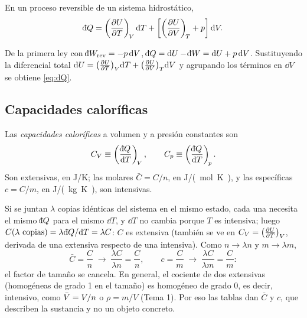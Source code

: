 \begin{proposicion}
En un proceso reversible de un sistema hidrostático,
\begin{equation}\label{eq:dQ}
  \dbar Q=\pd{U}{T}{V}\dd T+\left[\pd{U}{V}{T}+p\right]\dd V .
\end{equation}
\end{proposicion}

\begin{demostracion}
De la primera ley con $\dbar W_{\mathrm{rev}}=-p\,\dd V$, $\dbar Q=\dd U-\dbar W=\dd U+p\,\dd V$. Sustituyendo
la diferencial total $\mathrm{d} U=\bigl(\tfrac{\partial U}{\partial T}\bigr)_{V}\mathrm{d} T+\bigl(\tfrac{\partial U}{\partial V}\bigr)_{T}\mathrm{d} V$ y agrupando los términos en $\dd V$ se
obtiene \eqref{eq:dQ}.
\end{demostracion}

\subsection{Capacidades caloríficas}

\begin{definicion}
Las \emph{capacidades caloríficas} a volumen y a presión constantes son
\begin{equation}\label{eq:CVCp}
  C_V\equiv\left(\frac{\dbar Q}{\dd T}\right)_{\!V},\qquad C_p\equiv\left(\frac{\dbar Q}{\dd T}\right)_{\!p}.
\end{equation}
Son extensivas, en \si{J/K}; las molares $\bar C=C/n$, en \si{J/(mol.K)}, y las específicas $c=C/m$, en
\si{J/(kg.K)}, son intensivas.
\end{definicion}

\begin{observacion}
Si se juntan $\lambda$ copias idénticas del sistema en el mismo estado, cada una necesita el mismo $\dbar Q$
para el mismo $\dd T$, y $\dd T$ no cambia porque $T$ es intensiva; luego
$C(\lambda\ \text{copias})=\lambda\,\dbar Q/\dd T=\lambda C$: $C$ es extensiva (también se ve en
$C_V=\bigl(\tfrac{\partial U}{\partial T}\bigr)_{V}$, derivada de una extensiva respecto de una intensiva). Como $n\to\lambda n$ y $m\to\lambda m$,
\[
  \bar C=\frac{C}{n}\;\to\;\frac{\lambda C}{\lambda n}=\frac{C}{n},\qquad c=\frac{C}{m}\;\to\;\frac{\lambda C}{\lambda m}=\frac{C}{m}:
\]
el factor de tamaño se cancela. En general, el cociente de dos extensivas (homogéneas de grado 1 en el
tamaño) es homogéneo de grado 0, es decir, intensivo, como $\bar{V}=V/n$ o $\rho=m/V$ (Tema 1). Por eso las
tablas dan $\bar C$ y $c$, que describen la sustancia y no un objeto concreto.
\end{observacion}

